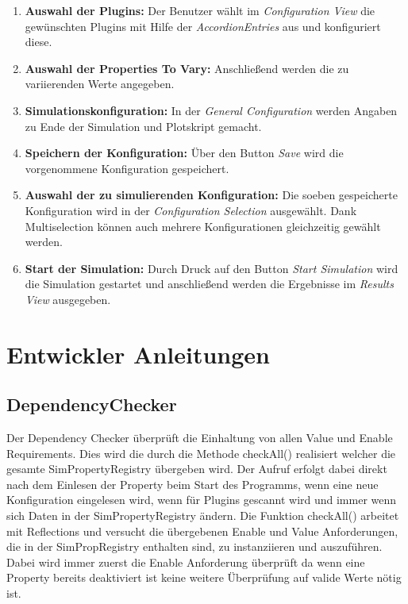 \documentclass[a4paper, 11pt]{article} %
\begin{document}
\begin{enumerate}
\item \textbf{Auswahl der Plugins:} \newline Der Benutzer wählt im \emph{Configuration View} die gewünschten Plugins mit Hilfe der \emph{AccordionEntries} aus und konfiguriert diese.
\item \textbf{Auswahl der Properties To Vary:} \newline Anschließend werden die zu variierenden Werte angegeben.
\item \textbf{Simulationskonfiguration:} \newline In der \emph{General Configuration} werden Angaben zu Ende der Simulation und Plotskript gemacht.
\item \textbf{Speichern der Konfiguration:} \newline Über den Button \emph{Save} wird die vorgenommene Konfiguration gespeichert.
\item \textbf{Auswahl der zu simulierenden Konfiguration:} \newline Die soeben gespeicherte Konfiguration wird in der \emph{Configuration Selection} ausgewählt. Dank Multiselection können auch mehrere Konfigurationen gleichzeitig gewählt werden.
\item \textbf{Start der Simulation:} \newline Durch Druck auf den Button \emph{Start Simulation} wird die Simulation gestartet und anschließend werden die Ergebnisse im \emph{Results View} ausgegeben. 
\end{enumerate}

\section{Entwickler Anleitungen} %
\label{sec:entwicklung}
\subsection{DependencyChecker}
\label{ssub:dependencychecker}
Der Dependency Checker überprüft die Einhaltung von allen Value und Enable Requirements. Dies wird die  durch die Methode checkAll() realisiert welcher die gesamte SimPropertyRegistry übergeben wird. Der Aufruf erfolgt dabei direkt nach dem Einlesen der Property beim Start des Programms, wenn eine neue Konfiguration eingelesen wird, wenn für Plugins gescannt wird und immer wenn sich Daten in der SimPropertyRegistry ändern.
Die Funktion checkAll() arbeitet mit Reflections und versucht die übergebenen Enable und Value Anforderungen, die in der SimPropRegistry enthalten sind, zu instanziieren und auszuführen.
Dabei wird immer zuerst die Enable Anforderung überprüft da wenn eine Property bereits deaktiviert ist keine weitere Überprüfung auf valide Werte nötig ist.
\end{document}
